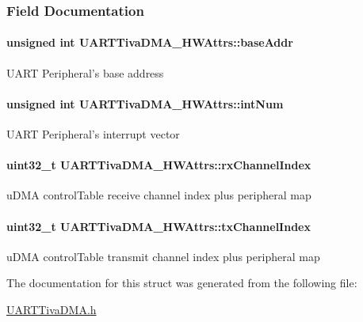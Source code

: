 \subsubsection{Field Documentation}
\paragraph[{base\-Addr}]{\setlength{\rightskip}{0pt plus 5cm}unsigned int U\-A\-R\-T\-Tiva\-D\-M\-A\-\_\-\-H\-W\-Attrs\-::base\-Addr}\label{struct_u_a_r_t_tiva_d_m_a___h_w_attrs_a0cee71a1b87b797dbf1e7660c1134611}
U\-A\-R\-T Peripheral's base address 
\paragraph[{int\-Num}]{\setlength{\rightskip}{0pt plus 5cm}unsigned int U\-A\-R\-T\-Tiva\-D\-M\-A\-\_\-\-H\-W\-Attrs\-::int\-Num}\label{struct_u_a_r_t_tiva_d_m_a___h_w_attrs_af51acdaa385973204a6c5741e3e26f40}
U\-A\-R\-T Peripheral's interrupt vector 
\paragraph[{rx\-Channel\-Index}]{\setlength{\rightskip}{0pt plus 5cm}uint32\-\_\-t U\-A\-R\-T\-Tiva\-D\-M\-A\-\_\-\-H\-W\-Attrs\-::rx\-Channel\-Index}\label{struct_u_a_r_t_tiva_d_m_a___h_w_attrs_a0c35ca59f07ed055b768efb74d304db1}
u\-D\-M\-A control\-Table receive channel index plus peripheral map 
\paragraph[{tx\-Channel\-Index}]{\setlength{\rightskip}{0pt plus 5cm}uint32\-\_\-t U\-A\-R\-T\-Tiva\-D\-M\-A\-\_\-\-H\-W\-Attrs\-::tx\-Channel\-Index}\label{struct_u_a_r_t_tiva_d_m_a___h_w_attrs_af4475ebe44ae2d17d0967c00266c586c}
u\-D\-M\-A control\-Table transmit channel index plus peripheral map 

The documentation for this struct was generated from the following file\-:\begin{DoxyCompactItemize}
\item 
\hyperlink{_u_a_r_t_tiva_d_m_a_8h}{U\-A\-R\-T\-Tiva\-D\-M\-A.\-h}\end{DoxyCompactItemize}
